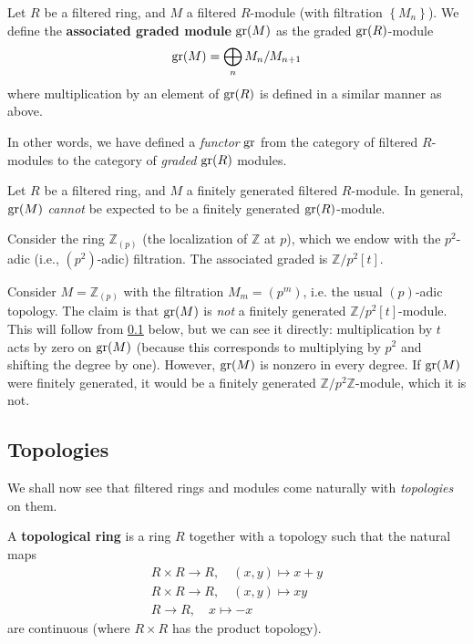 \begin{definition} 
Let $R$ be a filtered ring, and $M$ a filtered $R$-module (with filtration
$\left\{M_n\right\}$). We define the \textbf{associated graded module}
$\operatorname{gr}(M)$ as the graded $\operatorname{gr}(R)$-module
\[ \operatorname{gr}(M) = \bigoplus_{n} M_n/M_{n+1}  \]
where multiplication by an element of $\operatorname{gr}(R)$ is defined in a similar manner as above.
\end{definition} 

In other words, we have defined a \emph{functor} $\operatorname{gr}$ from the category of filtered
$R$-modules to the category of \emph{graded} $\operatorname{gr}(R)$ modules.


Let $R$ be a filtered ring, and $M$ a finitely generated filtered $R$-module.
In general, $\operatorname{gr}(M)$ \emph{cannot} be expected to be a finitely generated
$\operatorname{gr}(R)$-module.
\begin{example}
Consider the ring $\mathbb{Z}_{(p)}$ (the localization of
$\mathbb{Z}$ at $p$), which we endow with the $p^2$-adic (i.e., $(p^2)$-adic)
filtration. 
The associated graded is $\mathbb{Z}/p^2[t]$.

Consider $M=\mathbb{Z}_{(p)}$ with the filtration $M_m = (p^{m})$, i.e. the
usual $(p)$-adic topology. The claim is that $\operatorname{gr}(M)$ is 
\emph{not} a finitely generated $\mathbb{Z}/p^2[t]$-module. This will follow
from \cref{} below, but we can see it directly: multiplication by $t$ acts by
zero on $\operatorname{gr}(M)$ (because this corresponds to multiplying by $p^2$ and shifting
the degree by one).
However, $\operatorname{gr}(M)$ is nonzero in every degree. If $\operatorname{gr}(M)$ were finitely
generated, it would be a finitely generated $\mathbb{Z}/p^2 \mathbb{Z}$-module,
which it is not.
\end{example}

\subsection{Topologies}

We shall now see that filtered rings and modules come naturally with
\emph{topologies} on them. 

\begin{definition} 
A \textbf{topological ring} is a ring $R$ together with a topology such that
the natural maps
\begin{gather*} R \times R \to R, \quad  (x,y) \mapsto x+y \\
R \times R \to R, \quad (x,y) \mapsto xy \\
R \to R, \quad x \mapsto -x
\end{gather*}
are continuous (where $R \times R$ has the product topology).
\end{definition} 


